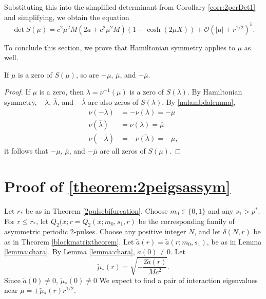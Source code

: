 \documentclass[thesis.tex]{subfiles}
\begin{document}
Substituting this into the simplified determinant from Corollary \ref{corr:2perDet1} and simplifying, we obtain the equation
\begin{equation}\label{2detBeqmu}
\det S(\mu) = c^2 \mu^2 M \left( 2a + c^2 \mu^2 M\right)\left(1 - \cosh(2 \mu X) \right) + \mathcal{O}(|\mu| + r^{1/2})^5.
\end{equation}

To conclude this section, we prove that Hamiltonian symmetry applies to $\mu$ as well.

\begin{lemma}\label{lemma:Hamsymmmu}
If $\mu$ is a zero of $S(\mu)$, so are $-\mu$, $\overline{\mu}$, and $-\overline{\mu}$.
\begin{proof}
If $\mu$ is a zero, then $\lambda = \nu^{-1}(\mu)$ is a zero of $S(\lambda)$. By Hamiltonian symmetry, $-\lambda$, $\overline{\lambda}$, and $-\overline{\lambda}$ are also zeros of $S(\lambda)$. By \cref{nulambdalemma},
\begin{align*}
\nu(-\lambda) &= -\nu(\lambda) = -\mu \\
\nu(\overline{\lambda}) &= \overline{ \nu(\lambda) } = \overline{\mu} \\
\nu(-\overline{\lambda}) &= -\overline{ \nu(\lambda) } = -\overline{\mu},
\end{align*}
it follows that $-\mu$, $\overline{\mu}$, and $-\overline{\mu}$ are all zeros of $S(\mu)$.
\end{proof}
\end{lemma}

\section{Proof of \cref{theorem:2peigsassym}}

Let $r_*$ be as in Theorem \ref{2pulsebifurcation}. Choose $m_0 \in \{ 0, 1\}$ and any $s_1 > p^*$. For $r \leq r_*$, let $Q_2(x; r = Q_2(x; m_0, s_1, r)$ be the corresponding family of asymmetric periodic 2-pulses. Choose any positive integer $N$, and let $\delta(N,r)$ be as in Theorem \ref{blockmatrixtheorem}. Let $\tilde{a}(r) = \tilde{a}(r; m_0, s_1)$, be as in Lemma \cref{lemma:chara}. By Lemma \cref{lemma:chara}, $\tilde{a}(0) \neq 0$. Let
\begin{equation}\label{2ptildemustar}
\tilde{\mu}_*(r) = \sqrt{-\frac{2\tilde{a}(r)}{M c^2}}.
\end{equation}
Since $\tilde{a}(0) \neq 0$, $\tilde{\mu}_*(0) \neq 0$
We expect to find a pair of interaction eigenvalues near $\mu = \pm \tilde{\mu}_*(r) r^{1/2}$. 
\end{document}
